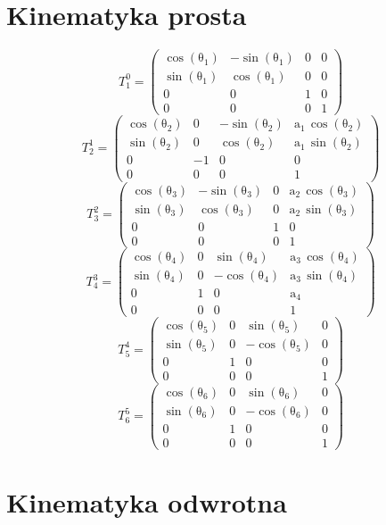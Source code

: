 \documentclass[]{article}
\begin{document}
\section{Kinematyka prosta}
\[T^0_1=\left(\begin{array}{cccc} \cos\!\left(\mathrm{\theta_1}\right) & - \sin\!\left(\mathrm{\theta_1}\right) & 0 & 0\\ \sin\!\left(\mathrm{\theta_1}\right) & \cos\!\left(\mathrm{\theta_1}\right) & 0 & 0\\ 0 & 0 & 1 & 0\\ 0 & 0 & 0 & 1 \end{array}\right)
\]
\[
T^1_2=\left(\begin{array}{cccc} \cos\!\left(\mathrm{\theta_2}\right) & 0 & - \sin\!\left(\mathrm{\theta_2}\right) & \mathrm{a_1}\, \cos\!\left(\mathrm{\theta_2}\right)\\ \sin\!\left(\mathrm{\theta_2}\right) & 0 & \cos\!\left(\mathrm{\theta_2}\right) & \mathrm{a_1}\, \sin\!\left(\mathrm{\theta_2}\right)\\ 0 & -1 & 0 & 0\\ 0 & 0 & 0 & 1 \end{array}\right)
\]
\[
T^2_3=\left(\begin{array}{cccc} \cos\!\left(\mathrm{\theta_3}\right) & - \sin\!\left(\mathrm{\theta_3}\right) & 0 & \mathrm{a_2}\, \cos\!\left(\mathrm{\theta_3}\right)\\ \sin\!\left(\mathrm{\theta_3}\right) & \cos\!\left(\mathrm{\theta_3}\right) & 0 & \mathrm{a_2}\, \sin\!\left(\mathrm{\theta_3}\right)\\ 0 & 0 & 1 & 0\\ 0 & 0 & 0 & 1 \end{array}\right)
\]
\[
T^3_4=\left(\begin{array}{cccc} \cos\!\left(\mathrm{\theta_4}\right) & 0 & \sin\!\left(\mathrm{\theta_4}\right) & \mathrm{a_3}\, \cos\!\left(\mathrm{\theta_4}\right)\\ \sin\!\left(\mathrm{\theta_4}\right) & 0 & - \cos\!\left(\mathrm{\theta_4}\right) & \mathrm{a_3}\, \sin\!\left(\mathrm{\theta_4}\right)\\ 0 & 1 & 0 & \mathrm{a_4}\\ 0 & 0 & 0 & 1 \end{array}\right)
\]
\[
T^4_5=\left(\begin{array}{cccc} \cos\!\left(\mathrm{\theta_5}\right) & 0 & \sin\!\left(\mathrm{\theta_5}\right) & 0\\ \sin\!\left(\mathrm{\theta_5}\right) & 0 & - \cos\!\left(\mathrm{\theta_5}\right) & 0\\ 0 & 1 & 0 & 0\\ 0 & 0 & 0 & 1 \end{array}\right)
\]
\[
T^5_6=\left(\begin{array}{cccc} \cos\!\left(\mathrm{\theta_6}\right) & 0 & \sin\!\left(\mathrm{\theta_6}\right) & 0\\ \sin\!\left(\mathrm{\theta_6}\right) & 0 & - \cos\!\left(\mathrm{\theta_6}\right) & 0\\ 0 & 1 & 0 & 0\\ 0 & 0 & 0 & 1 \end{array}\right)
\]
\section{Kinematyka odwrotna}
\end{document}
